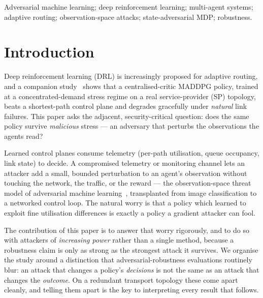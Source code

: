 \documentclass[10pt,journal,comsoc]{IEEEtran}
\begin{document}
\begin{IEEEkeywords}
Adversarial machine learning; deep reinforcement learning; multi-agent systems;
adaptive routing; observation-space attacks; state-adversarial MDP; robustness.
\end{IEEEkeywords}

\section{Introduction}
\label{sec:intro}
Deep reinforcement learning (DRL) is increasingly proposed for adaptive routing, and
a companion study~\cite{companion} shows that a centralised-critic MADDPG policy,
trained at a concentrated-demand stress regime on a real service-provider (SP)
topology, beats a shortest-path control plane and degrades gracefully under
\emph{natural} link failures. This paper asks the adjacent, security-critical
question: does the same policy survive \emph{malicious} stress --- an adversary that
perturbs the observations the agents read?

Learned control planes consume telemetry (per-path utilisation, queue occupancy, link
state) to decide. A compromised telemetry or monitoring channel lets an attacker add a
small, bounded perturbation to an agent's observation without touching the network,
the traffic, or the reward --- the observation-space threat model of adversarial
machine learning~\cite{goodfellow2015,huang2017adversarial}, transplanted from image
classification to a networked control loop. The natural worry is that a policy which
learned to exploit fine utilisation differences is exactly a policy a gradient
attacker can fool.

The contribution of this paper is to answer that worry rigorously, and to do so with
attackers of \emph{increasing power} rather than a single method, because a robustness
claim is only as strong as the strongest attack it survives. We organise the study
around a distinction that adversarial-robustness evaluations routinely blur: an attack
that changes a policy's \emph{decisions} is not the same as an attack that changes the
\emph{outcome}. On a redundant transport topology these come apart cleanly, and
telling them apart is the key to interpreting every result that follows.
\end{document}
